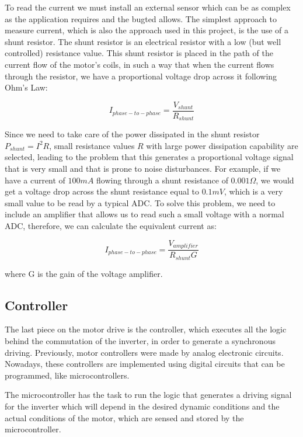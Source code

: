 To read the current we must install an external sensor which can be as complex as the application requires and the bugted allows. The simplest approach to measure current, which is also the approach used in this project, is the use of a shunt resistor. The shunt resistor is an electrical resistor with a low (but well controlled) resistance value. This shunt resistor is placed in the path of the current flow of the motor's coils, in such a way that when the current flows through the resistor, we have a proportional voltage drop across it following Ohm's Law:

\begin{equation}\label{ohm_shunt}
	I_{phase-to-phase} = \frac{V_{shunt}}{R_{shunt}}
\end{equation}

Since we need to take care of the power dissipated in the shunt resistor $P_{shunt} = I^{2}R$, small resistance values $R$ with large power dissipation capability are selected, leading to the problem that this generates a proportional voltage signal that is very small and that is prone to noise disturbances. For example, if we have a current of $100 mA$ flowing through a shunt resistance of $0.001 \Omega$, we would get a voltage drop across the shunt resistance equal to $0.1 mV$, which is a very small value to be read by a typical \acf{ADC}. To solve this problem, we need to include an amplifier that allows us to read such a small voltage with a normal \ac{ADC}, therefore, we can calculate the equivalent current as:

\begin{equation}\label{ohm_shunt}
	I_{phase-to-phase} = \frac{V_{amplifier}}{R_{shunt}G}
\end{equation}

where G is the gain of the voltage amplifier.

\subsection{Controller}

The last piece on the motor drive is the controller, which executes all the logic behind the commutation of the inverter, in order to generate a synchronous driving. Previously, motor controllers were made by analog electronic circuits. Nowadays, these controllers are implemented using digital circuits that can be programmed, like microcontrollers.

The microcontroller has the task to run the logic that generates a driving signal for the inverter which will depend in the desired dynamic conditions and the actual conditions of the motor, which are sensed and stored by the microcontroller.

